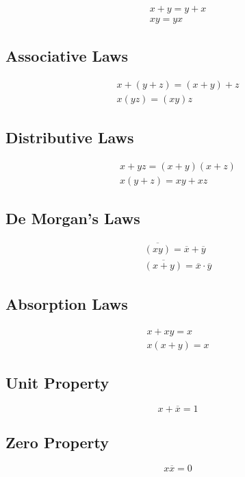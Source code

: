 \documentclass[12pt letter]{report}
\begin{document}
\begin{align*}
  x + y = y + x \\
  xy = yx
\end{align*}

\subsection{Associative Laws}

\begin{align*}
  x + \left( y + z \right)  = \left( x + y \right)  + z \\
  x \left( yz \right)  = \left( xy \right) z
\end{align*}

\subsection{Distributive Laws}

\begin{align*}
  x + yz = \left( x + y \right) \left( x + z \right) \\
  x \left( y + z \right) = xy + xz
\end{align*}

\subsection{De Morgan's Laws}

\begin{align*}
  \overline{\left( xy \right) } = \overline{x} + \overline{y} \\
  \overline{\left( x + y \right) } = \overline{x} \cdot \overline{y}
\end{align*}

\subsection{Absorption Laws}
\begin{align*}
  x + xy = x \\
  x \left( x + y \right)  = x
\end{align*}

\subsection{Unit Property}

\[
  x + \overline{x} = 1
\]

\subsection{Zero Property}
\[
  x \overline{x} = 0
\]
\end{document}
